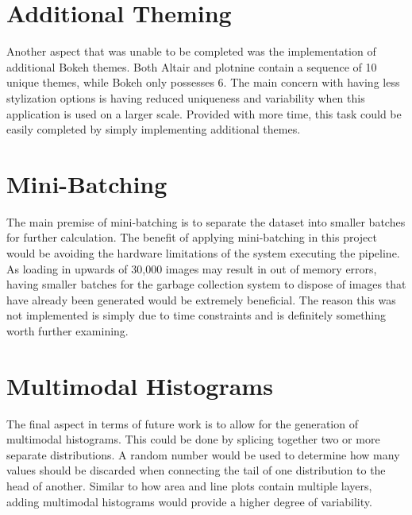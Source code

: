 \section{Additional Theming}
Another aspect that was unable to be completed was the implementation of additional Bokeh themes. Both Altair and plotnine contain a sequence of 10 unique themes, while Bokeh only possesses 6. The main concern with having less stylization options is having reduced uniqueness and variability when this application is used on a larger scale. Provided with more time, this task could be easily completed by simply implementing additional themes.

\section{Mini-Batching}
The main premise of mini-batching is to separate the dataset into smaller batches for further calculation. The benefit of applying mini-batching in this project would be avoiding the hardware limitations of the system executing the pipeline. As loading in upwards of 30,000 images may result in out of memory errors, having smaller batches for the garbage collection system to dispose of images that have already been generated would be extremely beneficial. The reason this was not implemented is simply due to time constraints and is definitely something worth further examining.

\section{Multimodal Histograms}
The final aspect in terms of future work is to allow for the generation of multimodal histograms. This could be done by splicing together two or more separate distributions. A random number would be used to determine how many values should be discarded when connecting the tail of one distribution to the head of another. Similar to how area and line plots contain multiple layers, adding multimodal histograms would provide a higher degree of variability.